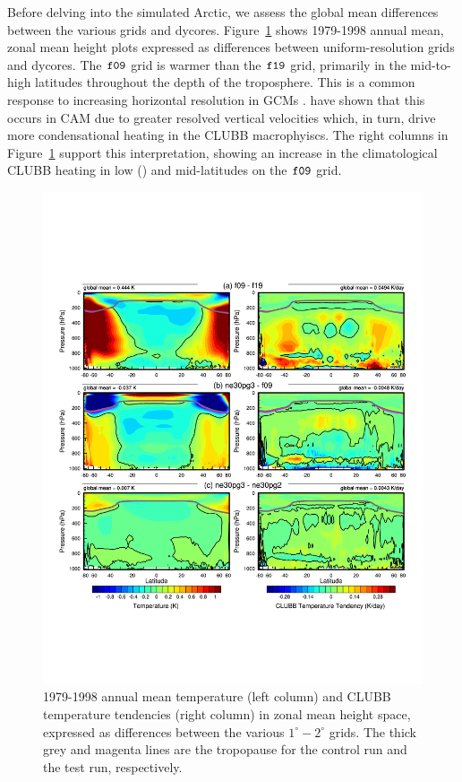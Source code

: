 \documentclass[draft]{agujournal2019}
\begin{document}
Before delving into the simulated Arctic, we assess the global mean differences between the various grids and dycores. Figure~\ref{fig:dT-lores} shows 1979-1998 annual mean, zonal mean height plots expressed as differences between uniform-resolution grids and dycores. The $\tt f09$ grid is warmer than the $\tt f19$ grid, primarily in the mid-to-high latitudes throughout the depth of the troposphere. This is a common response to increasing horizontal resolution in GCMs \cite{PS2002CD,RETAL2006JC}.
 have shown that this occurs in CAM due to greater resolved vertical velocities which, in turn, drive more condensational heating in the CLUBB macrophyiscs. The right columns in Figure~\ref{fig:dT-lores} support this interpretation, showing an increase in the climatological CLUBB heating in low ({\color{blue}{looks more like subtropics}}) and mid-latitudes on the $\tt f09$ grid. 

\begin{figure}[t]
\begin{center}
         \includegraphics[width=130mm]{figs/temp_dhgt_panel_STEND_CLUBB-lores.pdf}
\end{center}
\caption{1979-1998 annual mean temperature (left column) and CLUBB temperature tendencies (right column) in zonal mean height space, expressed as differences between the various $1^{\circ}-2^{\circ}$ grids. The thick grey and magenta lines are the tropopause for the control run and the test run, respectively.}
\label{fig:dT-lores}
\end{figure}
\end{document}
